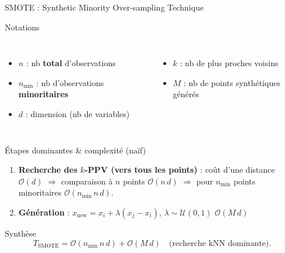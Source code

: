 \documentclass{beamer}
\begin{document}
  \begin{frame}[t,shrink=8]{SMOTE : Synthetic Minority Over-sampling Technique}

    \begin{block}{Notations}
    \footnotesize
    \begin{columns}[T,totalwidth=\textwidth]
      \begin{itemize}
        \setlength{\itemsep}{1pt}\setlength{\parskip}{0pt}
        \item $n$ : nb \textbf{total} d'observations
        \item $n_{\min}$ : nb d'observations \textbf{minoritaires}
        \item $d$ : dimension (nb de variables)
      \end{itemize}
      \begin{itemize}
        \setlength{\itemsep}{1pt}\setlength{\parskip}{0pt}
        \item $k$ : nb de plus proches voisins
        \item $M$ : nb de points synthétiques générés
      \end{itemize}
    \end{columns}
    \end{block}

    \begin{block}{Étapes dominantes \& complexité (naïf)}
    \footnotesize
    \begin{enumerate}
      \setlength{\itemsep}{2pt}\setlength{\parskip}{0pt}
      \item \textbf{Recherche des $k$-PPV (vers tous les points)} :
            coût d'une distance $\mathcal O(d)$ $\Rightarrow$
            comparaison à $n$ points $\mathcal O(n\,d)$ $\Rightarrow$
            pour $n_{\min}$ points minoritaires $\boxed{\mathcal O(n_{\min}\,n\,d)}$.
      \item \textbf{Génération} :
            $x_{\text{new}} = x_i + \lambda(x_j-x_i)$, $\lambda\sim\mathcal U(0,1)$
            \hfill $\boxed{\mathcal O(M\,d)}$
    \end{enumerate}
    \end{block}

    \begin{block}{Synthèse}
    \footnotesize
    \[
    \boxed{T_{\text{SMOTE}}=\mathcal O(n_{\min}\,n\,d) + \mathcal O(M\,d)}
    \quad\text{(recherche kNN dominante).}
    \]
    \end{block}

  \end{frame}
\end{document}
